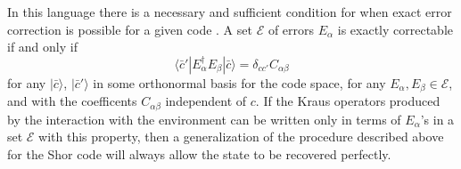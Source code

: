 \documentclass[12pt]{article}
\newcommand{\be}{\begin{equation}}
\newcommand{\ee}{\end{equation}}
\newcommand{\lan}{\langle}
\newcommand{\ran}{\rangle}
\begin{document}
In this language there is a necessary and sufficient condition for when exact error correction is possible for a given code \cite{bennett1996mixed,knill1997theory}.  A set $\mathcal{E}$ of errors $E_\alpha$ is exactly correctable if and only if
\be\label{correctcond}
\lan\bar{c}'|E_\alpha^\dagger E_\beta|\bar{c}\ran=\delta_{cc'}C_{\alpha\beta}
\ee
for any $|\bar{c}\ran$, $|\bar{c}'\ran$ in some orthonormal basis for the code space, for any $E_\alpha,E_\beta\in \mathcal{E}$, and with the coefficents $C_{\alpha\beta}$ independent of $c$.  If the Kraus operators produced by the interaction with the environment can be written only in terms of $E_\alpha$'s in a set $\mathcal{E}$ with this property, then a generalization of the procedure described above for the Shor code will always allow the state to be recovered perfectly.
\end{document}
